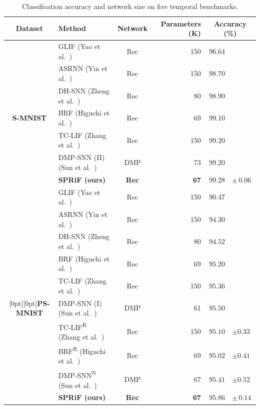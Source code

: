 \documentclass[letterpaper,journal]{IEEEtran}
\begin{document}
\begin{table}[!t]
\caption{Classification accuracy and network size on five temporal benchmarks.}
\label{tab:main_results}
\centering
\begingroup
\small
\setlength{\tabcolsep}{4pt}
\renewcommand{\arraystretch}{1.04}
\begin{tabular*}{\textwidth}{@{\extracolsep{\fill}}clcrr@{\extracolsep{0pt}\;}l@{}}
\toprule
\textbf{Dataset} & \textbf{Method} & \textbf{Network} & \textbf{Parameters (K)} & \multicolumn{2}{c}{\textbf{Accuracy (\%)}}\\
\midrule
 & GLIF (Yao et al.~\cite{glif}) & Rec & 150 & $96.64$ & \\
 & ASRNN (Yin et al.~\cite{asrnn}) & Rec & 150 & $98.70$ & \\
 & DH-SNN (Zheng et al.~\cite{dhsnn}) & Rec & 80 & $98.90$ & \\
\textbf{S-MNIST} & BRF (Higuchi et al.~\cite{brf}) & Rec & 69 & $99.10$ & \\
 & TC-LIF (Zhang et al.~\cite{tclif}) & Rec & 150 & $99.20$ & \\
 & DMP-SNN (II) (Sun et al.~\cite{sun2026dmp}) & DMP & 73 & $99.20$ & \\
 & \textbf{SPRiF (ours)} & \textbf{Rec} & \textbf{67} & $\mathbf{99.28}$ & $\boldsymbol{\pm}\,\mathbf{0.06}$\\
\midrule
 & GLIF (Yao et al.~\cite{glif}) & Rec & 150 & $90.47$ & \\
 & ASRNN (Yin et al.~\cite{asrnn}) & Rec & 150 & $94.30$ & \\
 & DH-SNN (Zheng et al.~\cite{dhsnn}) & Rec & 80 & $94.52$ & \\
 & BRF (Higuchi et al.~\cite{brf}) & Rec & 69 & $95.20$ & \\
 & TC-LIF (Zhang et al.~\cite{tclif}) & Rec & 150 & $95.36$ & \\
\raisebox{0.5\normalbaselineskip}[0pt][0pt]{\textbf{PS-MNIST}} & DMP-SNN (I) (Sun et al.~\cite{sun2026dmp}) & DMP & 61 & $95.50$ & \\
 & TC-LIF\textsuperscript{R} (Zhang et al.~\cite{tclif}) & Rec & 150 & $95.10$ & $\pm 0.33$\\
 & BRF\textsuperscript{R} (Higuchi et al.~\cite{brf}) & Rec & 69 & $95.02$ & $\pm 0.41$\\
 & DMP-SNN\textsuperscript{N} (Sun et al.~\cite{sun2026dmp}) & DMP & 67 & $95.41$ & $\pm 0.52$\\
 & \textbf{SPRiF (ours)} & \textbf{Rec} & \textbf{67} & $\mathbf{95.86}$ & $\boldsymbol{\pm}\,\mathbf{0.14}$\\

\end{tabular*}
\end{table}
\end{document}
